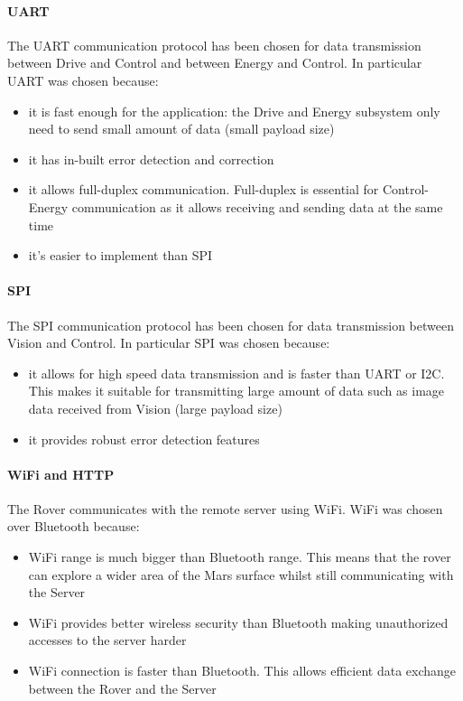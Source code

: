 \documentclass[10pt,twoside]{article}
\begin{document}
\paragraph{UART} The UART communication protocol has been chosen for data transmission between Drive and Control and between Energy and Control. 
In particular UART was chosen because: 
\begin{itemize}
    \item it is fast enough for the application: the Drive and Energy subsystem only need to send small amount of data (small payload size)
    \item it has in-built error detection and correction
    \item it allows full-duplex communication. Full-duplex is essential for Control-Energy communication as it allows receiving and sending data at the same time
    \item it's easier to implement than SPI
\end{itemize}


\paragraph{SPI} The SPI communication protocol has been chosen for data transmission between Vision and Control.
In particular SPI was chosen because: 
\begin{itemize}
    \item it allows for high speed data transmission and is faster than UART or I2C. This makes it suitable for transmitting large amount of data such as image data received from Vision  (large payload size)
    \item it provides robust error detection features
\end{itemize}


\paragraph{WiFi and HTTP} The Rover communicates with the remote server using WiFi.
WiFi was chosen over Bluetooth because:
\begin{itemize}
    \item WiFi range is much bigger than Bluetooth range. This means that the rover can explore a wider area of the Mars surface whilst still communicating with the Server
    \item WiFi provides better wireless security than Bluetooth making unauthorized accesses to the server harder
    \item WiFi connection is faster than Bluetooth. This allows efficient data exchange between the Rover and the Server
\end{itemize}
\end{document}
